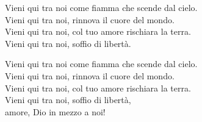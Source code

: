 
\strofa Vieni qui tra noi come fiamma che scende dal cielo.\\
Vieni qui tra noi, rinnova il cuore del mondo.\\
Vieni qui tra noi, col tuo amore rischiara la terra.\\
Vieni qui tra noi, soffio di libertà.

\spazio


\spazio

\strofa Vieni qui tra noi come fiamma che scende dal cielo.\\
Vieni qui tra noi, rinnova il cuore del mondo.\\
Vieni qui tra noi, col tuo amore rischiara la terra.\\
Vieni qui tra noi, soffio di libertà,\\
amore, Dio in mezzo a noi!